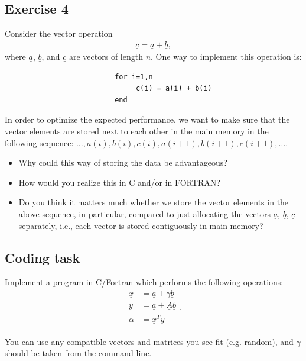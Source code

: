 \documentclass[11pt]{article}
\begin{document}
\subsection*{Exercise 4}

Consider the vector operation 
\begin{align*}
\underline{c} = \underline{a} + \underline{b},
\end{align*}
where $\underline{a}$, $\underline{b}$, and $\underline{c}$ 
are vectors of length $n$. One way to implement this operation is: 
\begin{verbatim}
                          for i=1,n
                               c(i) = a(i) + b(i)
                          end
\end{verbatim}

In order to optimize the expected performance, we want to make 
sure that the vector elements are stored next to each other 
in the main memory in the following sequence: 
$\ldots, a(i), b(i), c(i), a(i+1), b(i+1), c(i+1), \ldots$. 
\begin{itemize}
\item Why could this way of storing the data be advantageous?
\item How would you realize this in C and/or in FORTRAN?
\item Do you think it matters much whether we store the vector elements
in the above sequence, in particular, compared to just allocating the vectors 
$\underline{a}$, $\underline{b}$, $\underline{c}$ separately, 
i.e., each vector is stored contiguously in main memory?
\end{itemize}

\subsection*{Coding task}

Implement a program in C/Fortran which performs the following operations:
\[
  \begin{split}
    \underline{x} &= \underline{a} + \gamma\underline{b} \\
    \underline{y} &= \underline{a} + \underline{A}\underline{b} \\
    \alpha &= \underline{x}^T\underline{y}
  \end{split}.
\]

You can use any compatible vectors and matrices you see fit (e.g. random), and $\gamma$
should be taken from the command line.
\end{document}
